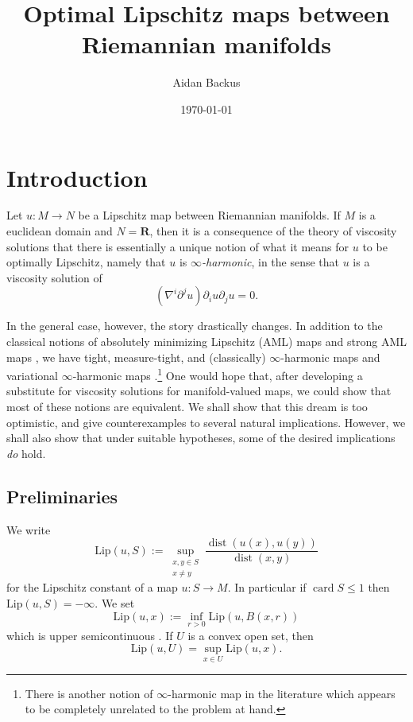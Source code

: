 \documentclass[reqno,11pt]{amsart}
\title{Optimal Lipschitz maps between Riemannian manifolds}
\author{Aidan Backus}
\date{\today}
\newcommand{\RR}{\mathbf{R}}
\DeclareMathOperator{\card}{card}
\DeclareMathOperator{\dist}{dist}
\newcommand{\Lip}{\mathrm{Lip}}
\newcommand{\dfn}[1]{\emph{#1}\index{#1}}
\theoremstyle{definition}
\numberwithin{equation}{section}
\begin{document}
\begin{abstract}

\end{abstract}

\maketitle
\section{Introduction}
Let $u: M \to N$ be a Lipschitz map between Riemannian manifolds.
If $M$ is a euclidean domain and $N = \RR$, then it is a consequence of the theory of viscosity solutions that there is essentially a unique notion of what it means for $u$ to be optimally Lipschitz, namely that $u$ is \dfn{$\infty$-harmonic}, in the sense that $u$ is a viscosity solution of 
$$(\nabla^i \partial^j u) \partial_i u \partial_j u = 0.$$

In the general case, however, the story drastically changes.
In addition to the classical notions of absolutely minimizing Lipschitz (AML) maps and strong AML maps \cite{Juutinen06}, we have tight, measure-tight, and (classically) $\infty$-harmonic maps \cite{Sheffield2010VectorvaluedOL} and variational $\infty$-harmonic maps \cite{daskalopoulos2022analytic}.\footnote{There is another notion of $\infty$-harmonic map in the literature \cite{Ou2012} which appears to be completely unrelated to the problem at hand.}
One would hope that, after developing a substitute for viscosity solutions for manifold-valued maps, we could show that most of these notions are equivalent.
We shall show that this dream is too optimistic, and give counterexamples to several natural implications.
However, we shall also show that under suitable hypotheses, some of the desired implications \emph{do} hold.

\subsection{Preliminaries}
We write
$$\Lip(u, S) := \sup_{\substack{x, y \in S \\ x \neq y}} \frac{\dist(u(x), u(y))}{\dist(x, y)}$$
for the Lipschitz constant of a map $u: S \to M$.
In particular if $\card S \leq 1$ then $\Lip(u, S) = -\infty$.
We set
$$\Lip(u, x) := \inf_{r > 0} \Lip(u, B(x, r))$$
which is upper semicontinuous \cite[Lemma 4.2(a)]{Crandall2008}.
If $U$ is a convex open set, then \cite[Lemma 4.2(d)]{Crandall2008}
$$\Lip(u, U) = \sup_{x \in U} \Lip(u, x).$$
\end{document}
